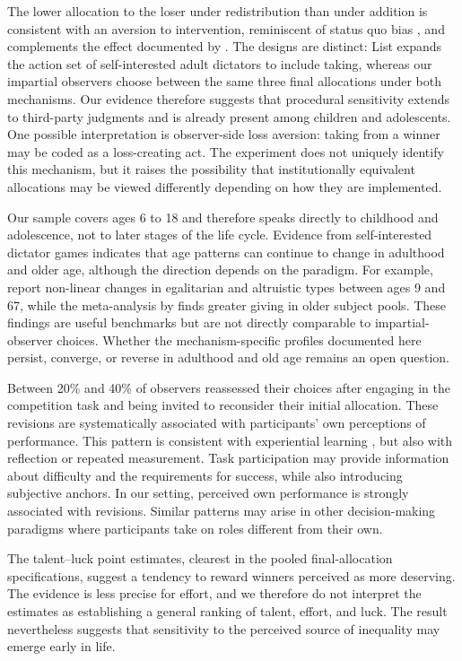 \documentclass[11pt]{article}
\begin{document}
The lower allocation to the loser under redistribution than under addition is consistent with an aversion to intervention, reminiscent of status quo bias \citep{kahneman1991anomalies}, and complements the effect documented by \citet{list2007interpretation}. The designs are distinct: List expands the action set of self-interested adult dictators to include taking, whereas our impartial observers choose between the same three final allocations under both mechanisms. Our evidence therefore suggests that procedural sensitivity extends to third-party judgments and is already present among children and adolescents. One possible interpretation is observer-side loss aversion: taking from a winner may be coded as a loss-creating act. The experiment does not uniquely identify this mechanism, but it raises the possibility that institutionally equivalent allocations may be viewed differently depending on how they are implemented.

Our sample covers ages 6 to 18 and therefore speaks directly to childhood and adolescence, not to later stages of the life cycle. Evidence from self-interested dictator games indicates that age patterns can continue to change in adulthood and older age, although the direction depends on the paradigm. For example, \citet{cobo2019development} report non-linear changes in egalitarian and altruistic types between ages 9 and 67, while the meta-analysis by \citet{engel2011dictator} finds greater giving in older subject pools. These findings are useful benchmarks but are not directly comparable to impartial-observer choices. Whether the mechanism-specific profiles documented here persist, converge, or reverse in adulthood and old age remains an open question.

Between 20\% and 40\% of observers reassessed their choices after engaging in the competition task and being invited to reconsider their initial allocation. These revisions are systematically associated with participants' own perceptions of performance. This pattern is consistent with experiential learning \citep{kolb2014experiential}, but also with reflection or repeated measurement. Task participation may provide information about difficulty and the requirements for success, while also introducing subjective anchors. In our setting, perceived own performance is strongly associated with revisions. Similar patterns may arise in other decision-making paradigms where participants take on roles different from their own.


The talent--luck point estimates, clearest in the pooled final-allocation specifications, suggest a tendency to reward winners perceived as more deserving. The evidence is less precise for effort, and we therefore do not interpret the estimates as establishing a general ranking of talent, effort, and luck. The result nevertheless suggests that sensitivity to the perceived source of inequality may emerge early in life.
\end{document}
